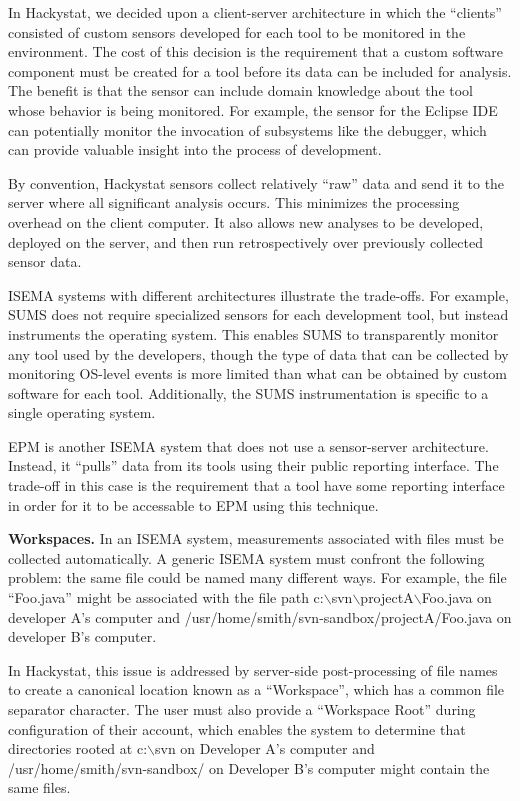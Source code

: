 \documentclass[10pt,twocolumn]{article}
\begin{document}
In Hackystat, we decided upon a client-server architecture in which the
``clients'' consisted of custom sensors developed for each tool to be
monitored in the environment.  The cost of this decision is the requirement
that a custom software component must be created for a tool before its data
can be included for analysis.  The benefit is that the sensor can include
domain knowledge about the tool whose behavior is being monitored. For
example, the sensor for the Eclipse IDE can potentially monitor the
invocation of subsystems like the debugger, which can provide valuable
insight into the process of development.  

By convention, Hackystat sensors collect relatively ``raw'' data and send
it to the server where all significant analysis occurs.  This minimizes the
processing overhead on the client computer. It also allows new analyses to
be developed, deployed on the server, and then run retrospectively over
previously collected sensor data.

ISEMA systems with different architectures illustrate the trade-offs.  For
example, SUMS does not require specialized sensors for each development
tool, but instead instruments the operating system. This enables SUMS to
transparently monitor any tool used by the developers, though the type of
data that can be collected by monitoring OS-level events is more limited
than what can be obtained by custom software for each tool.  Additionally,
the SUMS instrumentation is specific to a single operating system.

EPM is another ISEMA system that does not use a sensor-server architecture.
Instead, it ``pulls'' data from its tools using their public reporting
interface. The trade-off in this case is the requirement that a tool have
some reporting interface in order for it to be accessable to EPM using this
technique.

{\bf Workspaces.}  In an ISEMA system, measurements associated with
files must be collected automatically.  A generic ISEMA system
must confront the following problem: the same file could be named many
different ways. For example, the file ``Foo.java'' might be associated with
the file path c:$\backslash$svn$\backslash$projectA$\backslash$Foo.java on
developer A's computer and /usr/home/smith/svn-sandbox/projectA/Foo.java on
developer B's computer.

In Hackystat, this issue is addressed by server-side post-processing of
file names to create a canonical location known as a ``Workspace'', which
has a common file separator character. The user must also provide a
``Workspace Root'' during configuration of their account, which enables the
system to determine that directories rooted at c:$\backslash$svn on
Developer A's computer and /usr/home/smith/svn-sandbox/ on Developer B's
computer might contain the same files. 
\end{document}
